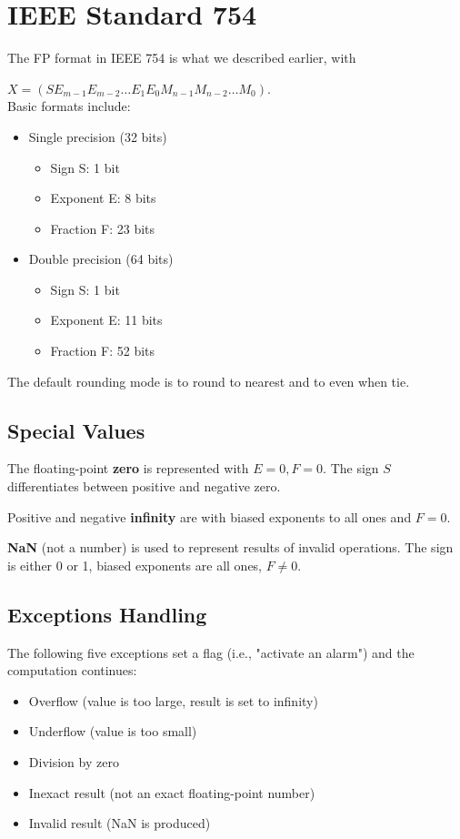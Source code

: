 \documentclass[10pt,a4paper]{book}
\begin{document}
\section{IEEE Standard 754}
The FP format in IEEE 754 is what we described earlier, with \par
$X=(SE_{m-1}E_{m-2}\ldots E_1E_0M_{n-1}M_{n-2}\ldots M_0)$.\\
Basic formats include:
\begin{itemize}
\item Single precision (32 bits)
	\begin{itemize}
	\item Sign S: 1 bit
	\item Exponent E: 8 bits
	\item Fraction F: 23 bits
	\end{itemize}
\item Double precision (64 bits)
	\begin{itemize}
	\item Sign S: 1 bit
	\item Exponent E: 11 bits
	\item Fraction F: 52 bits
	\end{itemize}
\end{itemize}
The default rounding mode is to round to nearest and to even when tie.

\subsection{Special Values}
The floating-point \textbf{zero} is represented with $E=0,F=0$. The sign $S$ differentiates between positive and negative zero.\par 
Positive and negative \textbf{infinity} are with biased exponents to all ones and $F=0$.\par 
\textbf{NaN} (not a number) is used to represent results of invalid operations. The sign is either 0 or 1, biased exponents are all ones, $F\neq0$.

\subsection{Exceptions Handling}
The following five exceptions set a flag (i.e., "activate an alarm") and the computation continues:
\begin{itemize}
\item Overflow (value is too large, result is set to infinity)
\item Underflow (value is too small)
\item Division by zero
\item Inexact result (not an exact floating-point number)
\item Invalid result (NaN is produced)
\end{itemize}
\end{document}
